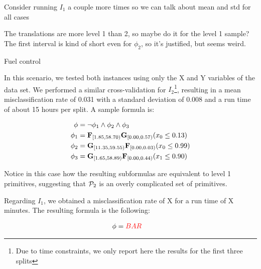 {\color{blue} Consider running $I_1$ a couple more times so we can talk about mean and std for all cases}

{\color{blue} The translations are more level 1 than 2, so maybe do it for the level 1 sample? The first interval is kind of short even for $\phi_2$, so it's justified, but seems weird.}

Fuel control

In this scenario, we tested both instances using only the {\color{red} X and Y} variables of the data set. We performed a similar cross-validation for $I_2$\footnote{Due to time constraints, we only report here the results for the first three splits}, resulting in a mean misclassification rate of 0.031 with a standard deviation of 0.008 and a run time of about 15 hours per split. A sample formula is:

\begin{equation}
    \label{eq:fuel2}
\begin{aligned}
    \phi & =  \neg \phi_1 \wedge \phi_2 \wedge \phi_3 \\
    \phi_1 & = \mathbf{F}_{[1.85, 58.70)} \mathbf{G}_{[0.00, 0.57)} (x_0 \le 0.13) \\
    \phi_2 & = \mathbf{G}_{[11.35, 59.55)} \mathbf{F}_{[0.00, 0.03)} (x_0 \le 0.99) \\
    \phi_3 & = \mathbf{G}_{[1.65, 58.89)} \mathbf{F}_{[0.00, 0.44)} (x_1 \le 0.90) \\
\end{aligned}
\end{equation}

Notice in this case how the resulting subformulas are equivalent to level 1 primitives, suggesting that $\mathcal{P}_2$ is an overly complicated set of primitives.

Regarding $I_1$, we obtained a misclassification rate of {\color{red} X} for a run time of {\color{red} X} minutes. The resulting formula is the following:


\begin{equation}
    \label{eq:fuel1}
\begin{aligned}
    \phi & =  {\color{red} BAR}
\end{aligned}
\end{equation}
